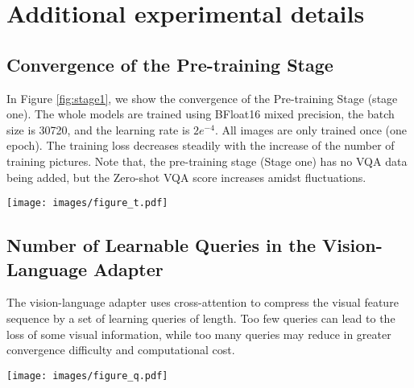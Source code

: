 \documentclass{article}
\begin{document}
\section{Additional experimental details}

\subsection{Convergence of the Pre-training Stage}
\label{app:first_stage}

In Figure \ref{fig:stage1}, we show the convergence of the Pre-training Stage (stage one). The whole models are trained using BFloat16
mixed precision, the batch size is 30720, and the learning rate is $2e^{-4}$. All images are only trained once (one epoch). The training loss decreases steadily with the increase of the number of training pictures. Note that, the pre-training stage (Stage one) has no VQA data being added, but the Zero-shot VQA score increases amidst fluctuations.

\begin{figure*}[ht]
\centering
\texttt{[image: images/figure\_t.pdf]}
   \caption{Visualization of the Convergence of the Pre-training Stage}
\label{fig:stage1}
\end{figure*}

\subsection{Number of Learnable Queries in the Vision-Language Adapter}
\label{app:n_queries}

The vision-language adapter uses cross-attention to compress the visual feature sequence by a set of learning queries of length. Too few queries can lead to the loss of some visual information, while too many queries may reduce in greater convergence difficulty and computational cost.

\begin{figure*}[ht]
\centering
\texttt{[image: images/figure\_q.pdf]}
   \caption{Visualization of the training loss when using different compressed feature lengths of the vision-language adapter. The left depicts the initial training loss (within 50 steps), and the right depicts the loss in convergence (1k-5k steps). In the legend, L64 denotes that the adapter uses 64 queries to compress the visual feature sequence to a fixed length of 64, and so on. The loss curves have been smoothed to avoid shading owing to fluctuations.}
\label{fig:ablation_adapter}
\end{figure*}
\end{document}
